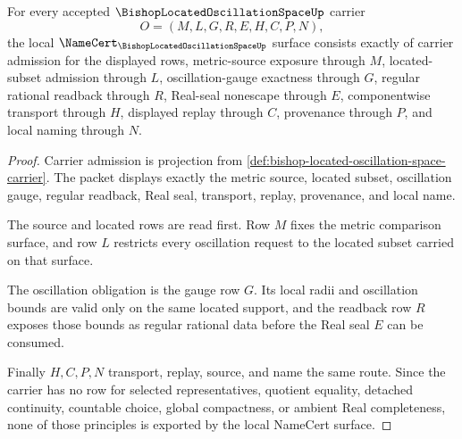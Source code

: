 \begin{theorem}
\label{thm:bishop-located-oscillation-space-namecert-obligations}
For every accepted $\BishopLocatedOscillationSpaceUp$ carrier
$$
O=(M,L,G,R,E,H,C,P,N),
$$
the local $\NameCert_{\BishopLocatedOscillationSpaceUp}$ surface consists exactly of carrier admission for the displayed rows, metric-source exposure through $M$, located-subset admission through $L$, oscillation-gauge exactness through $G$, regular rational readback through $R$, Real-seal nonescape through $E$, componentwise transport through $H$, displayed replay through $C$, provenance through $P$, and local naming through $N$.
\end{theorem}
\begin{proof}
Carrier admission is projection from \autoref{def:bishop-located-oscillation-space-carrier}. The packet displays exactly the metric source, located subset, oscillation gauge, regular readback, Real seal, transport, replay, provenance, and local name.

The source and located rows are read first. Row $M$ fixes the metric comparison surface, and row $L$ restricts every oscillation request to the located subset carried on that surface.

The oscillation obligation is the gauge row $G$. Its local radii and oscillation bounds are valid only on the same located support, and the readback row $R$ exposes those bounds as regular rational data before the Real seal $E$ can be consumed.

Finally $H,C,P,N$ transport, replay, source, and name the same route. Since the carrier has no row for selected representatives, quotient equality, detached continuity, countable choice, global compactness, or ambient Real completeness, none of those principles is exported by the local NameCert surface.
\end{proof}

